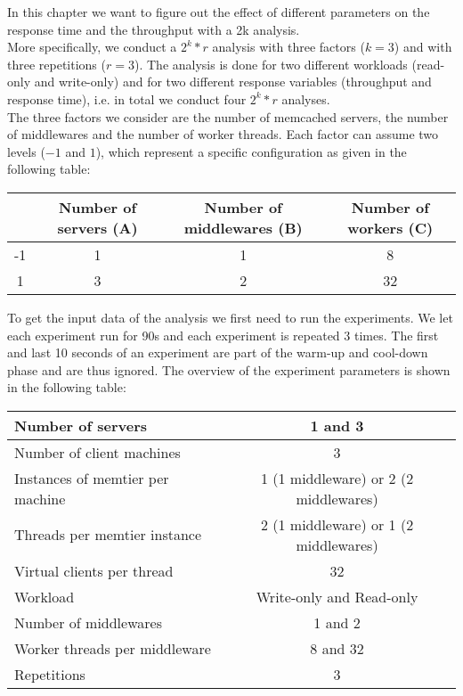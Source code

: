 In this chapter we want to figure out the effect of different parameters on the response time and the throughput with a 2k analysis. \\
More specifically, we conduct a $2^k*r$ analysis with three factors ($k=3$) and with three repetitions ($r=3$). The analysis is done for two different workloads (read-only and write-only) and for two different response variables (throughput and response time), i.e. in total we conduct four $2^k*r$ analyses. \\
The three factors we consider are the number of memcached servers, the number of middlewares and the number of worker threads. Each factor can assume two levels ($-1$ and $1$), which represent a specific configuration as given in the following table:
\begin{center}
	\scriptsize{	
		\begin{table}[!ht]
			\centering
			\begin{tabulary}{\linewidth}{ | C | C | C | C | }
				\hline 	&	Number of servers (\textbf{A})	&	Number of middlewares (\textbf{B})	& Number of workers (\textbf{C})	\\
					&	1	&	1	&	8	\\
					&	3	&	2	&	32	\\
				\hline 
			\end{tabulary}
		\end{table}
	}
\end{center}
To get the input data of the analysis we first need to run the experiments. We let each experiment run for 90s and each experiment is repeated 3 times.  The first and last 10 seconds of an experiment are part of the warm-up and cool-down phase and are thus ignored. The overview of the experiment parameters is shown in the following table:
\begin{center}
	\scriptsize{
		\begin{tabular}{|l|c|}
			\hline Number of servers                & 1 and 3                                     \\ 
			\hline Number of client machines        & 3                                           \\ 
			\hline Instances of memtier per machine & 1 (1 middleware) or 2 (2 middlewares) \\ 
			\hline Threads per memtier instance     & 2 (1 middleware) or 1 (2 middlewares)   \\
			\hline Virtual clients per thread       &  32                                     \\ 
			\hline Workload                         & Write-only and Read-only\\
			\hline Number of middlewares            & 1 and 2                                     \\
			\hline Worker threads per middleware    & 8 and 32                                    \\
			\hline Repetitions                      & 3                                  \\ 
			\hline 
		\end{tabular}
	} 
\end{center}

